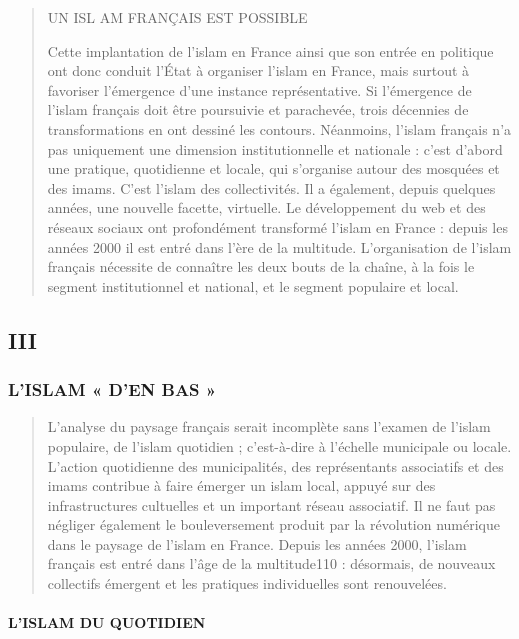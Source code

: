\begin{quote}
UN ISL AM FRANÇAIS EST POSSIBLE

Cette implantation de l'islam en France ainsi que son entrée en
politique ont donc conduit l'État à organiser l'islam en France, mais
surtout à favoriser l'émergence d'une instance représentative. Si
l'émergence de l'islam français doit être poursuivie et parachevée,
trois décennies de transformations en ont dessiné les contours.
Néanmoins, l'islam français n'a pas uniquement une dimension
institutionnelle et nationale : c'est d'abord une pratique, quotidienne
et locale, qui s'organise autour des mosquées et des imams. C'est
l'islam des collectivités. Il a également, depuis quelques années, une
nouvelle facette, virtuelle. Le développement du web et des réseaux
sociaux ont profondément transformé l'islam en France : depuis les
années 2000 il est entré dans l'ère de la multitude. L'organisation de
l'islam français nécessite de connaître les deux bouts de la chaîne, à
la fois le segment institutionnel et national, et le segment populaire
et local.
\end{quote}

\hypertarget{iii}{%
\subsection{III}\label{iii}}

\hypertarget{lislam-den-bas}{%
\subsubsection{L'ISLAM « D'EN BAS »}\label{lislam-den-bas}}

\begin{quote}
L'analyse du paysage français serait incomplète sans l'examen de l'islam
populaire, de l'islam quotidien ; c'est-à-dire à l'échelle municipale ou
locale. L'action quotidienne des municipalités, des représentants
associatifs et des imams contribue à faire émerger un islam local,
appuyé sur des infrastructures cultuelles et un important réseau
associatif. Il ne faut pas négliger également le bouleversement produit
par la révolution numérique dans le paysage de l'islam en France. Depuis
les années 2000, l'islam français est entré dans l'âge de la
multitude110 : désormais, de nouveaux collectifs émergent et les
pratiques individuelles sont renouvelées.
\end{quote}

\hypertarget{lislam-du-quotidien}{%
\paragraph{L'ISLAM DU QUOTIDIEN}\label{lislam-du-quotidien}}

